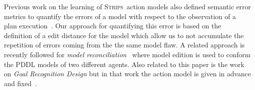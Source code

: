 \documentclass[letterpaper]{article} %
\newcommand{\strips}{\textsc{Strips}}     %
\begin{document}
Previous work on the learning of \strips\ action models also defined semantic error metrics to quantify the errors of a model with respect to the observation of a plan execution~\cite{yang2007learning}. Our approach for quantifying this error is based on the definition of a edit distance for the model which allow us to not accumulate the repetition of errors coming from the the same model flaw. A related approach is recently followed for {\em model reconciliation}~\cite{ChakrabortiSZK17} where model edition is used to conform the PDDL models of two different agents. Also  related to this paper is the work on {\em Goal Recognition Design} but in that work the action model is given in advance and fixed~\cite{KerenGK14}.




\newpage



\end{document}
